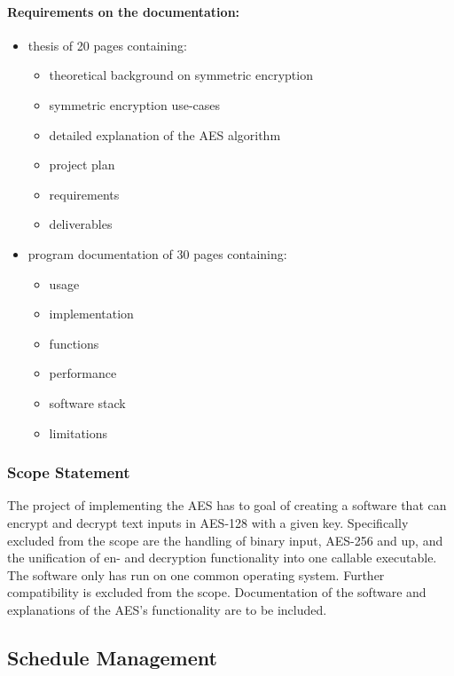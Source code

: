 \paragraph{Requirements on the documentation:}
\begin{itemize}
  \item thesis of 20 pages containing:
  \begin{itemize}
    \item theoretical background on symmetric encryption
    \item symmetric encryption use-cases
    \item detailed explanation of the \ac{AES} algorithm
    \item project plan
    \item requirements
    \item deliverables
  \end{itemize}
  \item program documentation of 30 pages containing:
  \begin{itemize}
    \item usage
    \item implementation
    \item functions
    \item performance
    \item software stack
    \item limitations
  \end{itemize}
\end{itemize}

\subsubsection{Scope Statement}
\label{ch:scopestatement}
\begin{tcolorbox}
  The project of implementing the \ac{AES} has to goal of creating a software that can encrypt and decrypt text inputs in AES-128 with a given key. Specifically excluded from the scope are the handling of binary input, AES-256 and up, and the unification of en- and decryption functionality into one callable executable. The software only has run on one common operating system. Further compatibility is excluded from the scope. Documentation of the software and explanations of the \ac{AES}'s functionality are to be included.
\end{tcolorbox}


\subsection{Schedule Management}
\label{ch:schedulemanagement}

